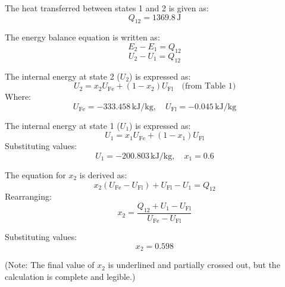 The heat transferred between states 1 and 2 is given as:  
\[
Q_{12} = 1369.8 \, \text{J}
\]

The energy balance equation is written as:  
\[
E_2 - E_1 = Q_{12}
\]  
\[
U_2 - U_1 = Q_{12}
\]

The internal energy at state 2 (\(U_2\)) is expressed as:  
\[
U_2 = x_2 U_{\text{Fe}} + (1 - x_2) U_{\text{Fl}} \quad \text{(from Table 1)}
\]  
Where:  
\[
U_{\text{Fe}} = -333.458 \, \text{kJ/kg}, \quad U_{\text{Fl}} = -0.045 \, \text{kJ/kg}
\]

The internal energy at state 1 (\(U_1\)) is expressed as:  
\[
U_1 = x_1 U_{\text{Fe}} + (1 - x_1) U_{\text{Fl}}
\]  
Substituting values:  
\[
U_1 = -200.803 \, \text{kJ/kg}, \quad x_1 = 0.6
\]

The equation for \(x_2\) is derived as:  
\[
x_2 (U_{\text{Fe}} - U_{\text{Fl}}) + U_{\text{Fl}} - U_1 = Q_{12}
\]  
Rearranging:  
\[
x_2 = \frac{Q_{12} + U_1 - U_{\text{Fl}}}{U_{\text{Fe}} - U_{\text{Fl}}}
\]

Substituting values:  
\[
x_2 = 0.598
\]  

(Note: The final value of \(x_2\) is underlined and partially crossed out, but the calculation is complete and legible.)